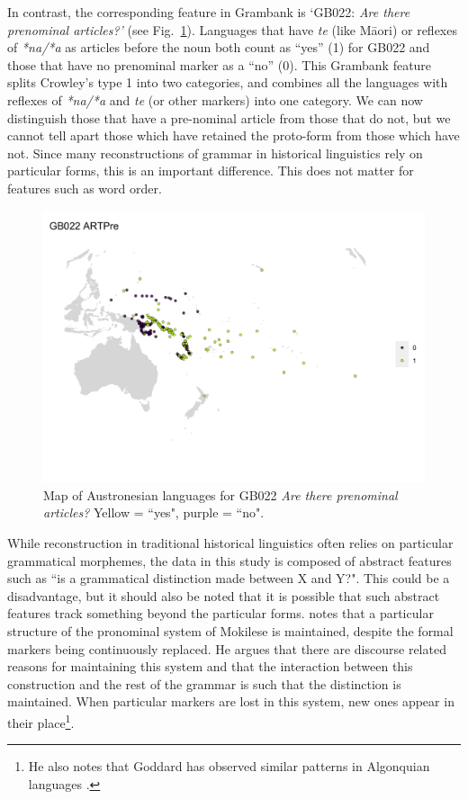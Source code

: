 \documentclass[a4paper,10pt]{article} %
\begin{document}
In contrast, the corresponding feature in Grambank is `GB022: \emph{Are there prenominal articles?'} (see Fig.~\ref{fig:gb022_map}). Languages that have \emph{te} (like M\={a}ori) or reflexes of \emph{*na/*a} as articles before the noun both count as ``yes'' (1) for GB022 and those that have no prenominal marker as a ``no'' (0). This Grambank feature splits Crowley's type 1 into two categories, and combines all the languages with reflexes of \emph{*na/*a} and \emph{te} (or other markers) into one category. We can now distinguish those that have a pre-nominal article from those that do not, but we cannot tell apart those which have retained the proto-form from those which have not. Since many reconstructions of grammar in historical linguistics rely on particular forms, this is an important difference. This does not matter for features such as word order.

\begin{figure}
\centering
\includegraphics[width=20cm]{illustrations/plots_from_R/coverage_plots/maps/map_GB022.png}
\caption{{Map of Austronesian languages for GB022 \emph{Are there prenominal articles?} Yellow = ``yes", purple = ``no".}}
\label{fig:gb022_map}
\end{figure}

While reconstruction in traditional historical linguistics often relies on particular grammatical morphemes, the data in this study is composed of abstract features such as ``is a grammatical distinction made between X and Y?". This could be a disadvantage, but it should also be noted that it is possible that such abstract features track something beyond the particular forms. \citet[503]{ross2004morphosyntactic} notes that a particular structure of the pronominal system of Mokilese is maintained, despite the formal markers being continuously replaced. He argues that there are discourse related reasons for maintaining this system and that the interaction between this construction and the rest of the grammar is such that the distinction is maintained. When particular markers are lost in this system, new ones appear in their place\footnote{He also notes that Goddard has observed similar patterns in Algonquian languages \citep{goddard1993algonquian}.}.
\end{document}
